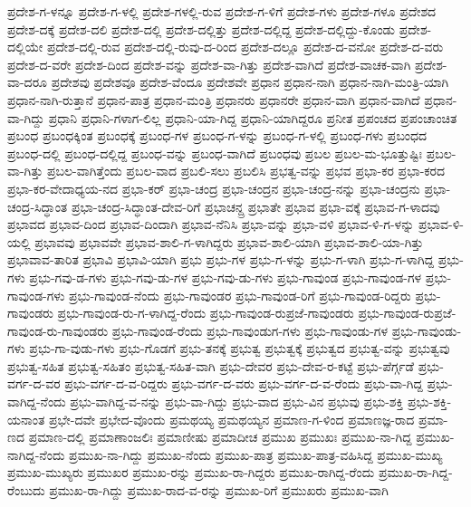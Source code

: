 ಪ್ರದೇಶ-ಗ-ಳನ್ನೂ
ಪ್ರದೇಶ-ಗ-ಳಲ್ಲಿ
ಪ್ರದೇಶ-ಗಳಲ್ಲಿ-ರುವ
ಪ್ರದೇಶ-ಗ-ಳಿಗೆ
ಪ್ರದೇಶ-ಗಳು
ಪ್ರದೇಶ-ಗಳೂ
ಪ್ರದೇಶದ
ಪ್ರದೇಶ-ದಕ್ಕೆ
ಪ್ರದೇಶ-ದಲಿ
ಪ್ರದೇಶ-ದಲ್ಲಿ
ಪ್ರದೇಶ-ದಲ್ಲಿತ್ತು
ಪ್ರದೇಶ-ದಲ್ಲಿದ್ದ
ಪ್ರದೇಶ-ದಲ್ಲಿದ್ದು-ಕೊಂಡು
ಪ್ರದೇಶ-ದಲ್ಲಿಯೇ
ಪ್ರದೇಶ-ದಲ್ಲಿ-ರುವ
ಪ್ರದೇಶ-ದಲ್ಲಿ-ರುವು-ದ-ರಿಂದ
ಪ್ರದೇಶ-ದಲ್ಲೂ
ಪ್ರದೇಶ-ದ-ವನೋ
ಪ್ರದೇಶ-ದ-ವರು
ಪ್ರದೇಶ-ದ-ವರೇ
ಪ್ರದೇಶ-ದಿಂದ
ಪ್ರದೇಶ-ವನ್ನು
ಪ್ರದೇಶ-ವಾ-ಗಿತ್ತು
ಪ್ರದೇಶ-ವಾಗಿದೆ
ಪ್ರದೇಶ-ವಾಚಕ-ವಾಗಿ
ಪ್ರದೇಶ-ವಾ-ದರೂ
ಪ್ರದೇಶವು
ಪ್ರದೇಶವೂ
ಪ್ರದೇಶ-ವೆಂದೂ
ಪ್ರದೇಶವೇ
ಪ್ರಧಾನ
ಪ್ರಧಾನ-ನಾಗಿ
ಪ್ರಧಾನ-ನಾಗಿ-ಮಂತ್ರಿ-ಯಾಗಿ
ಪ್ರಧಾನ-ನಾಗಿ-ರುತ್ತಾನೆ
ಪ್ರಧಾನ-ಪಾತ್ರ
ಪ್ರಧಾನ-ಮಂತ್ರಿ
ಪ್ರಧಾನರು
ಪ್ರಧಾನರೇ
ಪ್ರಧಾನ-ವಾಗಿ
ಪ್ರಧಾನ-ವಾಗಿದೆ
ಪ್ರಧಾನ-ವಾ-ಗಿದ್ದು
ಪ್ರಧಾನಿ
ಪ್ರಧಾನಿ-ಗಳಾಗ-ಲಿಲ್ಲ
ಪ್ರಧಾನಿ-ಯಾ-ಗಿದ್ದ
ಪ್ರಧಾನಿ-ಯಾಗಿದ್ದರೂ
ಪ್ರನೀತ
ಪ್ರಪಂಚದ
ಪ್ರಪಂಚಾಂಚಿತ
ಪ್ರಬಂಧ
ಪ್ರಬಂಧಕ್ಕಿಂತ
ಪ್ರಬಂಧಕ್ಕೆ
ಪ್ರಬಂಧ-ಗಳ
ಪ್ರಬಂಧ-ಗ-ಳನ್ನು
ಪ್ರಬಂಧ-ಗ-ಳಲ್ಲಿ
ಪ್ರಬಂಧ-ಗಳು
ಪ್ರಬಂಧದ
ಪ್ರಬಂಧ-ದಲ್ಲಿ
ಪ್ರಬಂಧ-ದಲ್ಲಿದ್ದ
ಪ್ರಬಂಧ-ವನ್ನು
ಪ್ರಬಂಧ-ವಾಗಿದೆ
ಪ್ರಬಂಧವು
ಪ್ರಬಲ
ಪ್ರಬಲ-ಮ-ಭೂತ್ತುಷ್ಟಿಃ
ಪ್ರಬಲ-ವಾ-ಗಿತ್ತು
ಪ್ರಬಲ-ವಾಗಿತ್ತೆಂದು
ಪ್ರಬಲ-ವಾದ
ಪ್ರಬಲಿ-ಸಲು
ಪ್ರಬಲಿಸಿ
ಪ್ರಭತ್ವ-ವನ್ನು
ಪ್ರಭವ
ಪ್ರಭಾ-ಕರ
ಪ್ರಭಾ-ಕರದ
ಪ್ರಭಾ-ಕರ-ವೇದಾಧ್ಯಯ-ನದ
ಪ್ರಭಾ-ಕರ್
ಪ್ರಭಾ-ಚಂದ್ರ
ಪ್ರಭಾ-ಚಂದ್ರನ
ಪ್ರಭಾ-ಚಂದ್ರ-ನನ್ನು
ಪ್ರಭಾ-ಚಂದ್ರನು
ಪ್ರಭಾ-ಚಂದ್ರ-ಸಿದ್ಧಾಂತ
ಪ್ರಭಾ-ಚಂದ್ರ-ಸಿದ್ಧಾಂತ-ದೇವ-ರಿಗೆ
ಪ್ರಭಾಚನ್ದ್ರ
ಪ್ರಭಾತೇ
ಪ್ರಭಾವ
ಪ್ರಭಾ-ವಕ್ಕೆ
ಪ್ರಭಾವ-ಗ-ಳಾದವು
ಪ್ರಭಾವದ
ಪ್ರಭಾವ-ದಿಂದ
ಪ್ರಭಾವ-ದಿಂದಾಗಿ
ಪ್ರಭಾವ-ನೆನಿಸಿ
ಪ್ರಭಾ-ವನ್ನು
ಪ್ರಭಾ-ವಳಿ
ಪ್ರಭಾವ-ಳಿ-ಗ-ಳನ್ನು
ಪ್ರಭಾವ-ಳಿ-ಯಲ್ಲಿ
ಪ್ರಭಾವವು
ಪ್ರಭಾವವೇ
ಪ್ರಭಾವ-ಶಾಲಿ-ಗ-ಳಾಗಿದ್ದರು
ಪ್ರಭಾವ-ಶಾಲಿ-ಯಾಗಿ
ಪ್ರಭಾವ-ಶಾಲಿ-ಯಾ-ಗಿತ್ತು
ಪ್ರಭಾವಾವ-ತಾರಿತ
ಪ್ರಭಾವಿ
ಪ್ರಭಾವಿ-ಯಾಗಿ
ಪ್ರಭು
ಪ್ರಭು-ಗಳ
ಪ್ರಭು-ಗ-ಳನ್ನು
ಪ್ರಭು-ಗ-ಳಾಗಿ
ಪ್ರಭು-ಗ-ಳಾಗಿದ್ದ
ಪ್ರಭು-ಗಳು
ಪ್ರಭು-ಗವು-ಡ-ಗಳು
ಪ್ರಭು-ಗವು-ಡು-ಗಳ
ಪ್ರಭು-ಗವು-ಡು-ಗಳು
ಪ್ರಭು-ಗಾವುಂಡ
ಪ್ರಭು-ಗಾವುಂಡ-ಗಳ
ಪ್ರಭು-ಗಾವುಂಡ-ಗಳು
ಪ್ರಭು-ಗಾವುಂಡ-ನೆಂದು
ಪ್ರಭು-ಗಾವುಂಡರ
ಪ್ರಭು-ಗಾವುಂಡ-ರಿಗೆ
ಪ್ರಭು-ಗಾವುಂಡ-ರಿದ್ದರು
ಪ್ರಭು-ಗಾವುಂಡರು
ಪ್ರಭು-ಗಾವುಂಡ-ರು-ಗ-ಳಾಗಿದ್ದ-ರೆಂದು
ಪ್ರಭು-ಗಾವುಂಡ-ರುಪ್ರಜೆ-ಗಾವುಂಡರು
ಪ್ರಭು-ಗಾವುಂಡ-ರುಪ್ರಜೆ-ಗಾವುಂಡ-ರು-ಗಾವುಂಡರು
ಪ್ರಭು-ಗಾವುಂಡ-ರೆಂದು
ಪ್ರಭು-ಗಾವುಂಡುಗ-ಗಳು
ಪ್ರಭು-ಗಾವುಂಡು-ಗಳ
ಪ್ರಭು-ಗಾವುಂಡು-ಗಳು
ಪ್ರಭು-ಗಾ-ವುಡು-ಗಳು
ಪ್ರಭು-ಗೊಡಗೆ
ಪ್ರಭು-ತನಕ್ಕೆ
ಪ್ರಭುತ್ವ
ಪ್ರಭುತ್ವಕ್ಕೆ
ಪ್ರಭುತ್ವದ
ಪ್ರಭುತ್ವ-ವನ್ನು
ಪ್ರಭುತ್ವವು
ಪ್ರಭುತ್ವ-ಸಹಿತ
ಪ್ರಭುತ್ವ-ಸಹಿತಂ
ಪ್ರಭುತ್ವ-ಸಹಿತ-ವಾಗಿ
ಪ್ರಭು-ದೇವರ
ಪ್ರಭು-ದೇವ-ರ-ಕಟ್ಟೆ
ಪ್ರಭು-ಪೆರ್ಗ್ಗಡೆ
ಪ್ರಭು-ವರ್ಗ-ದ-ವರ
ಪ್ರಭು-ವರ್ಗ-ದ-ವ-ರಿದ್ದರು
ಪ್ರಭು-ವರ್ಗ-ದ-ವರು
ಪ್ರಭು-ವರ್ಗ-ದ-ವ-ರೆಂದು
ಪ್ರಭು-ವಾ-ಗಿದ್ದ
ಪ್ರಭು-ವಾಗಿದ್ದ-ನೆಂದು
ಪ್ರಭು-ವಾಗಿದ್ದ-ವ-ನನ್ನು
ಪ್ರಭು-ವಾ-ಗಿದ್ದು
ಪ್ರಭು-ವಾದ
ಪ್ರಭು-ವಿನ
ಪ್ರಭುವು
ಪ್ರಭು-ಶಕ್ತಿ
ಪ್ರಭು-ಶಕ್ತಿ-ಯನಾಂತ
ಪ್ರಭೇ-ದವೇ
ಪ್ರಭೇದ-ವೊಂದು
ಪ್ರಮಥಯ್ಯ
ಪ್ರಮಥಯ್ಯನ
ಪ್ರಮಾಣ-ಗ-ಳಿಂದ
ಪ್ರಮಾಣಜ್ಞ-ರಾದ
ಪ್ರಮಾ-ಣದ
ಪ್ರಮಾಣ-ದಲ್ಲಿ
ಪ್ರಮಾಣಾಂಜಲಿಃ
ಪ್ರಮಾಣೀಷು
ಪ್ರಮಾದೀಚ
ಪ್ರಮುಖ
ಪ್ರಮುಖಃ
ಪ್ರಮುಖ-ನಾ-ಗಿದ್ದ
ಪ್ರಮುಖ-ನಾಗಿದ್ದ-ನೆಂದು
ಪ್ರಮುಖ-ನಾ-ಗಿದ್ದು
ಪ್ರಮುಖ-ನೆಂದು
ಪ್ರಮುಖ-ಪಾತ್ರ
ಪ್ರಮುಖ-ಪಾತ್ರ-ವಹಿಸಿದ್ದ
ಪ್ರಮುಖ-ಮುಖ್ಯ
ಪ್ರಮುಖ-ಮುಖ್ಯರು
ಪ್ರಮುಖರ
ಪ್ರಮುಖ-ರನ್ನು
ಪ್ರಮುಖ-ರಾ-ಗಿದ್ದರು
ಪ್ರಮುಖ-ರಾಗಿದ್ದ-ರೆಂದು
ಪ್ರಮುಖ-ರಾ-ಗಿದ್ದ-ರೆಂಬುದು
ಪ್ರಮುಖ-ರಾ-ಗಿದ್ದು
ಪ್ರಮುಖ-ರಾದ-ವ-ರನ್ನು
ಪ್ರಮುಖ-ರಿಗೆ
ಪ್ರಮುಖರು
ಪ್ರಮುಖ-ವಾಗಿ
